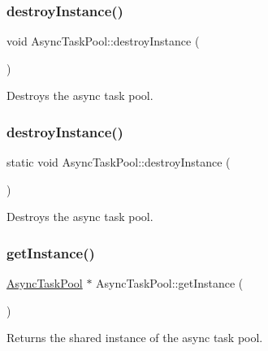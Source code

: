 \subsubsection{\texorpdfstring{destroy\+Instance()}{destroyInstance()}\hspace{0.1cm}{\footnotesize\ttfamily [1/2]}}
{\footnotesize\ttfamily void Async\+Task\+Pool\+::destroy\+Instance (\begin{DoxyParamCaption}{ }\end{DoxyParamCaption})\hspace{0.3cm}{\ttfamily [static]}}

Destroys the async task pool. \mbox{\label{classAsyncTaskPool_a3b8724f5864c54e50c207496284b6af5}} 
\subsubsection{\texorpdfstring{destroy\+Instance()}{destroyInstance()}\hspace{0.1cm}{\footnotesize\ttfamily [2/2]}}
{\footnotesize\ttfamily static void Async\+Task\+Pool\+::destroy\+Instance (\begin{DoxyParamCaption}{ }\end{DoxyParamCaption})\hspace{0.3cm}{\ttfamily [static]}}

Destroys the async task pool. \mbox{\label{classAsyncTaskPool_ab5fb56f692bc6ad57b53a5ce0dcd7a06}} 
\subsubsection{\texorpdfstring{get\+Instance()}{getInstance()}\hspace{0.1cm}{\footnotesize\ttfamily [1/2]}}
{\footnotesize\ttfamily \hyperlink{classAsyncTaskPool}{Async\+Task\+Pool} $\ast$ Async\+Task\+Pool\+::get\+Instance (\begin{DoxyParamCaption}{ }\end{DoxyParamCaption})\hspace{0.3cm}{\ttfamily [static]}}

Returns the shared instance of the async task pool. \mbox{\label{classAsyncTaskPool_a218bb071a3ed7ddf9a609a66e6275b37}} 
